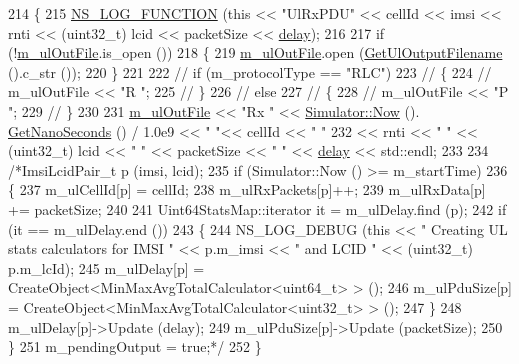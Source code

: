 \begin{DoxyCode}
214 \{
215   \hyperlink{log-macros-disabled_8h_a90b90d5bad1f39cb1b64923ea94c0761}{NS\_LOG\_FUNCTION} (\textcolor{keyword}{this} << \textcolor{stringliteral}{"UlRxPDU"} << cellId << imsi << rnti << (uint32\_t) lcid << 
      packetSize << \hyperlink{lte_2model_2fading-traces_2fading__trace__generator_8m_a7964e6aa8f61a9d28973c8267a606ad8}{delay});
216 
217   \textcolor{keywordflow}{if} (!\hyperlink{classns3_1_1MmWaveBearerStatsCalculator_ab21257dfc9d424a270882b7f0b906f7c}{m\_ulOutFile}.is\_open ())
218   \{
219         \hyperlink{classns3_1_1MmWaveBearerStatsCalculator_ab21257dfc9d424a270882b7f0b906f7c}{m\_ulOutFile}.open (\hyperlink{classns3_1_1MmWaveBearerStatsCalculator_a12a6c9cb22f57948ef0cc2a53d8cac92}{GetUlOutputFilename} ().c\_str ());
220   \}
221 
222   \textcolor{comment}{// if (m\_protocolType == "RLC")}
223   \textcolor{comment}{// \{}
224   \textcolor{comment}{//    m\_ulOutFile << "R ";}
225   \textcolor{comment}{// \}}
226   \textcolor{comment}{// else}
227   \textcolor{comment}{// \{}
228   \textcolor{comment}{//    m\_ulOutFile << "P ";}
229   \textcolor{comment}{// \}}
230 
231   \hyperlink{classns3_1_1MmWaveBearerStatsCalculator_ab21257dfc9d424a270882b7f0b906f7c}{m\_ulOutFile} << \textcolor{stringliteral}{"Rx "} << \hyperlink{classns3_1_1Simulator_ac3178fa975b419f7875e7105be122800}{Simulator::Now} ().
      \hyperlink{classns3_1_1Time_a2fdb7bf0e1f5cd93b6149cb37bbb7f08}{GetNanoSeconds} () / 1.0e9 << \textcolor{stringliteral}{" "}<< cellId << \textcolor{stringliteral}{" "}
232                 << rnti << \textcolor{stringliteral}{" "} << (uint32\_t) lcid << \textcolor{stringliteral}{" "} << packetSize << \textcolor{stringliteral}{" "} << 
      \hyperlink{lte_2model_2fading-traces_2fading__trace__generator_8m_a7964e6aa8f61a9d28973c8267a606ad8}{delay} << std::endl;
233 
234   \textcolor{comment}{/*ImsiLcidPair\_t p (imsi, lcid);}
235 \textcolor{comment}{  if (Simulator::Now () >= m\_startTime)}
236 \textcolor{comment}{    \{}
237 \textcolor{comment}{      m\_ulCellId[p] = cellId;}
238 \textcolor{comment}{      m\_ulRxPackets[p]++;}
239 \textcolor{comment}{      m\_ulRxData[p] += packetSize;}
240 \textcolor{comment}{}
241 \textcolor{comment}{      Uint64StatsMap::iterator it = m\_ulDelay.find (p);}
242 \textcolor{comment}{      if (it == m\_ulDelay.end ())}
243 \textcolor{comment}{        \{}
244 \textcolor{comment}{          NS\_LOG\_DEBUG (this << " Creating UL stats calculators for IMSI " << p.m\_imsi << " and LCID " <<
       (uint32\_t) p.m\_lcId);}
245 \textcolor{comment}{          m\_ulDelay[p] = CreateObject<MinMaxAvgTotalCalculator<uint64\_t> > ();}
246 \textcolor{comment}{          m\_ulPduSize[p] = CreateObject<MinMaxAvgTotalCalculator<uint32\_t> > ();}
247 \textcolor{comment}{        \}}
248 \textcolor{comment}{      m\_ulDelay[p]->Update (delay);}
249 \textcolor{comment}{      m\_ulPduSize[p]->Update (packetSize);}
250 \textcolor{comment}{    \}}
251 \textcolor{comment}{  m\_pendingOutput = true;*/}
252 \}
\end{DoxyCode}


